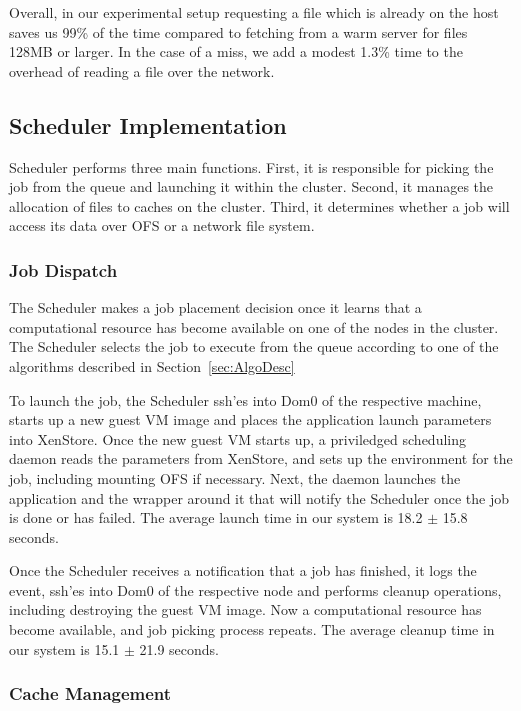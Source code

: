 Overall, in our experimental setup requesting a file which is already
on the host saves us 99\% of the time compared to fetching from
a warm server for files 128MB or larger. In the case of a miss, we add
a modest 1.3\% time to the overhead of reading a file over the
network.

\subsection{Scheduler Implementation}

Scheduler performs three main functions.  First, it is responsible for
picking the job from the queue and launching it within the
cluster. Second, it manages the allocation of files to caches on the
cluster. Third, it determines whether a job will access its data over
OFS or a network file system.

\subsubsection{Job Dispatch}

The Scheduler makes a job placement decision once it learns that a
computational resource has become available on one of the nodes in the
cluster. The Scheduler selects the job to execute from the queue
according to one of the algorithms described in
Section~\ref{sec:AlgoDesc}

To launch the job, the Scheduler ssh'es into Dom0 of the respective
machine, starts up a new guest VM image and places the application
launch parameters into XenStore. Once the new guest VM starts up, a
priviledged scheduling daemon reads the parameters from XenStore, and
sets up the environment for the job, including mounting OFS if
necessary. Next, the daemon launches the application and the wrapper
around it that will notify the Scheduler once the job is done or has
failed. The average launch time in our system is 18.2 $\pm$ 15.8
seconds.

Once the Scheduler receives a notification that a job has finished, it
logs the event, ssh'es into Dom0 of the respective node and performs
cleanup operations, including destroying the guest VM image. Now a
computational resource has become available, and job picking process
repeats. The average cleanup time in our system is 15.1 $\pm$ 21.9
seconds.

\subsubsection{Cache Management}

